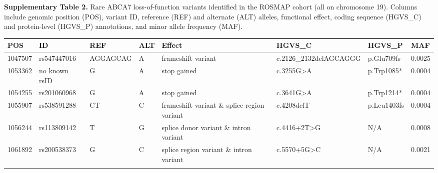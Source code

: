 \clearpage
\textbf{Supplementary Table 2.} Rare ABCA7 loss-of-function variants identified in the ROSMAP cohort (all on chromosome 19). Columns include genomic position (POS), variant ID, reference (REF) and alternate (ALT) alleles, functional effect, coding sequence (HGVS\_C) and protein-level (HGVS\_P) annotations, and minor allele frequency (MAF). \\
\begin{longtable}{%
    p{1.5cm}                   %
    p{2.8cm}                   %
    p{2cm}                     %
    p{1cm}                     %
    p{1.5cm}    %
    p{4.5cm}  %
    p{1.7cm}                     %
    p{1cm}                     %
  }
\hline
\textbf{POS} & \textbf{ID} & \textbf{REF} & \textbf{ALT} & \textbf{Effect} & \textbf{HGVS\_C} & \textbf{HGVS\_P} & \textbf{MAF} \\
\hline
\hline
1047507 & rs547447016 & AGGAGCAG & A & frameshift variant                          & c.2126\_2132delAGCAGGG & p.Glu709fs  & 0.0025 \\
\hline
1053362 & no known rsID           & G        & A & stop gained                                 & c.3255G>A               & p.Trp1085*  & 0.0004  \\
\hline
1054255 & rs201060968 & G        & A & stop gained                                 & c.3641G>A               & p.Trp1214*  & 0.0004  \\
\hline
1055907 & rs538591288 & CT       & C & frameshift variant \& splice region variant & c.4208delT              & p.Leu1403fs & 0.0004  \\
\hline
1056244 & rs113809142 & T        & G & splice donor variant \& intron variant      & c.4416+2T>G             &    N/A         & 0.0008  \\
\hline
1061892 & rs200538373 & G        & C & splice region variant \& intron variant     & c.5570+5G>C             &    N/A         & 0.0021 \\
\hline
\label{tab:abca7_lof_simplified}
\end{longtable}


